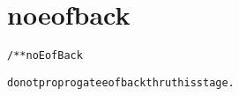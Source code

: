 \section{noeofback}
\begin{shaded}
\begin{alltt}
/** noEofBack

do not proprogate eof back thru this stage.

\end{alltt}
\end{shaded}
